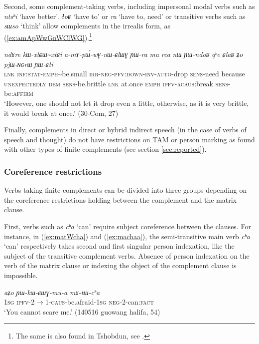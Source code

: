 \documentclass[oneside,a4paper,11pt]{article}
\newcommand{\ipa}[1]{\textit{\phon#1}}
\newcommand{\jpg}[2]{\ipa{#1} `#2'}
\newcommand{\tld}{\textasciitilde{}}
\begin{document}
Second, some complement-taking verbs, including impersonal modal verbs such as \jpg{ntsʰi}{have better}, \jpg{ɬoʁ}{have to} or \jpg{ra}{have to, need} or transitive verbs such as \jpg{sɯso}{think} allow complements in the irrealis form, as (\ref{ex:amApWwGnWClWG}).\footnote{The same is also found in Tshobdun, see \citet[483]{sun12complementation}.}

\begin{exe}
\ex \label{ex:amApWwGnWClWG}
\gll 
\ipa{ndɤre} 	\ipa{kɯ-xtɕɯ\tld{}xtɕi} 	\ipa{a-mɤ-pɯ́-wɣ-nɯ-ɕlɯɣ} 	\ipa{ɲɯ-ra} 	\ipa{ma} 	\ipa{rca} 	\ipa{nɯ} 	\ipa{ɲɯ-ndoʁ} 	\ipa{qʰe} 	\ipa{ɕlaʁ} 	\ipa{ʑo} 	\ipa{pjɯ-ɴɢrɯ} 	\ipa{ɲɯ-ɕti} \\
\textsc{lnk} \textsc{inf:stat-emph}\tld{}be.small \textsc{irr-neg-pfv:down-inv-auto}-drop \textsc{sens}-need because \textsc{unexpectedly} \textsc{dem} \textsc{sens}-be.brittle \textsc{lnk} at.once \textsc{emph} \textsc{ipfv-acaus}:break \textsc{sens}-be:\textsc{affirm} \\
\glt `However, one should not let it drop even a little, otherwise, as it is very brittle, it would break at once.' (30-Com, 27)
\end{exe}


Finally, complements in direct or hybrid indirect speech (in the case of verbs of speech and thought) do not have restrictions on TAM or person marking as found with other types of finite complements (see section \ref{sec:reported}).

\subsubsection{Coreference restrictions} \label{sec:finitie.coref}
Verbs taking finite complements can be divided into three groups depending on the coreference restrictions holding between the complement and the matrix clause.

First, verbs such as \jpg{cʰa}{can} require subject coreference between the clauses. For instance, in (\ref{ex:matWcha}) and (\ref{ex:machaa}), the semi-transitive main verb \jpg{cʰa}{can} respectively takes second and first singular person indexation, like the subject of the transitive complement verbs. Absence of person indexation on the verb of the matrix clause or indexing the object of the complement clause is impossible.

\begin{exe}
\ex \label{ex:matWcha}
\gll \ipa{aʑo} 	\ipa{ɲɯ-kɯ-ɕɯɣ-mu-a} 	\ipa{mɤ-tɯ-cʰa} \\
\textsc{1sg} \textsc{ipfv-2$\rightarrow$1-caus}-be.afraid-\textsc{1sg} \textsc{neg}-2-can:\textsc{fact} \\
\glt `You cannot scare me.' (140516 guowang halifa, 54)
\end{exe}
\end{document}
